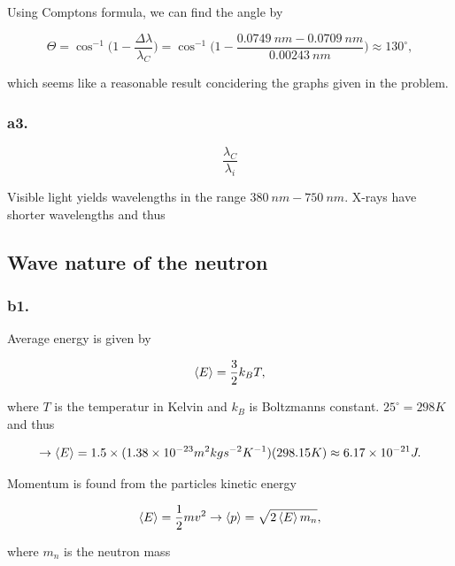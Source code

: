 \documentclass{article}
\begin{document}
Using Comptons formula, we can find the angle by

\begin{equation}
\Theta = \cos^{-1}{\big( 1 - \frac{\Delta \lambda}{\lambda_C} \big)} = \cos^{-1}{\big(1 - \frac{0.0749 \ nm - 0.0709 \ nm}{0.00243 \ nm} \big)} \approx 130^{\circ},
\end{equation}

which seems like a reasonable result concidering the graphs given in the problem.

\subsubsection*{a3.}

\begin{equation}
\frac{\lambda_C}{\lambda_i}
\end{equation}

Visible light yields wavelengths in the range $380 \ nm - 750 \ nm$. X-rays have shorter wavelengths and thus 
 

\subsection*{Wave nature of the neutron}

\subsubsection*{b1.}

Average energy is given by

\begin{equation}
\braket{E} = \frac{3}{2}k_BT,
\end{equation}

where $T$ is the temperatur in Kelvin and $k_B$ is Boltzmanns constant. $25^\circ = 298K$ and thus

\begin{equation}
\rightarrow \braket{E} = 1.5\times(1.38\times 10^{-23}m^2kgs^{-2}K^{-1})(298.15K) \approx 6.17\times 10^{-21}J.
\end{equation}

Momentum is found from the particles kinetic energy

\begin{equation}
\braket{E} = \frac{1}{2}mv^2 \rightarrow \braket{p} = \sqrt{2\braket{E}m_n},
\end{equation}

where $m_n$ is the neutron mass
\end{document}
